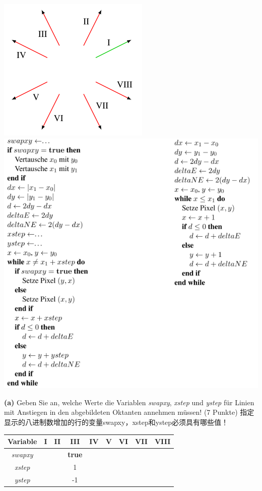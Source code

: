 \documentclass[fleqn]{article}
\begin{document}
\begin{center}
    \includegraphics[scale=0.6]{11.png}
    \includegraphics[scale=0.6]{12.png}
\end{center}

\indent\textbf{(a)} Geben Sie an, welche Werte die Variablen \textit{swapxy}, \textit{xstep} und \textit{ystep} für Linien mit Anstiegen in den abgebildeten Oktanten annehmen müssen! (7 Punkte)
指定显示的八进制数增加的行的变量swapxy，xstep和ystep必须具有哪些值！

\begin{center}
    \begin{tabular}{c|c|c|c|c|c|c|c|c}
        Variable &I&II&III&IV&V&VI&VII&VIII\\
        \hline
        \hline
        \textit{swapxy}&&&\textbf{true}&&&&&\\
        \hline
        \textit{xstep}&&&1&&&&&\\
        \hline
        \textit{ystep}&&&-1&&&&&
    \end{tabular}
\end{center}
\end{document}
